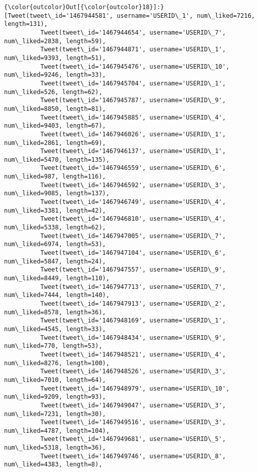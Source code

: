\documentclass[11pt]{article}
\begin{document}
\begin{Verbatim}[commandchars=\\\{\}]
{\color{outcolor}Out[{\color{outcolor}18}]:} [Tweet(tweet\_id='1467944581', username='USERID\_1', num\_liked=7216, length=131),
          Tweet(tweet\_id='1467944654', username='USERID\_7', num\_liked=2838, length=59),
          Tweet(tweet\_id='1467944871', username='USERID\_1', num\_liked=9393, length=51),
          Tweet(tweet\_id='1467945476', username='USERID\_10', num\_liked=9246, length=33),
          Tweet(tweet\_id='1467945704', username='USERID\_1', num\_liked=526, length=62),
          Tweet(tweet\_id='1467945787', username='USERID\_9', num\_liked=8850, length=81),
          Tweet(tweet\_id='1467945885', username='USERID\_4', num\_liked=9403, length=67),
          Tweet(tweet\_id='1467946026', username='USERID\_1', num\_liked=2861, length=69),
          Tweet(tweet\_id='1467946137', username='USERID\_1', num\_liked=5470, length=135),
          Tweet(tweet\_id='1467946559', username='USERID\_6', num\_liked=987, length=116),
          Tweet(tweet\_id='1467946592', username='USERID\_3', num\_liked=9085, length=137),
          Tweet(tweet\_id='1467946749', username='USERID\_4', num\_liked=3381, length=42),
          Tweet(tweet\_id='1467946810', username='USERID\_4', num\_liked=5338, length=62),
          Tweet(tweet\_id='1467947005', username='USERID\_7', num\_liked=6974, length=53),
          Tweet(tweet\_id='1467947104', username='USERID\_6', num\_liked=5847, length=24),
          Tweet(tweet\_id='1467947557', username='USERID\_9', num\_liked=8449, length=110),
          Tweet(tweet\_id='1467947713', username='USERID\_7', num\_liked=7444, length=140),
          Tweet(tweet\_id='1467947913', username='USERID\_2', num\_liked=8578, length=36),
          Tweet(tweet\_id='1467948169', username='USERID\_1', num\_liked=4545, length=33),
          Tweet(tweet\_id='1467948434', username='USERID\_9', num\_liked=770, length=53),
          Tweet(tweet\_id='1467948521', username='USERID\_4', num\_liked=8276, length=100),
          Tweet(tweet\_id='1467948526', username='USERID\_3', num\_liked=7010, length=64),
          Tweet(tweet\_id='1467948979', username='USERID\_10', num\_liked=9209, length=93),
          Tweet(tweet\_id='1467949047', username='USERID\_3', num\_liked=7231, length=30),
          Tweet(tweet\_id='1467949516', username='USERID\_3', num\_liked=4787, length=104),
          Tweet(tweet\_id='1467949681', username='USERID\_5', num\_liked=5318, length=36),
          Tweet(tweet\_id='1467949746', username='USERID\_8', num\_liked=4383, length=8),

\end{Verbatim}
\end{document}
